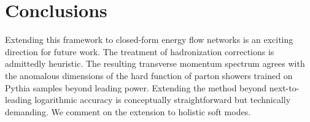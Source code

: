 \section{Conclusions}\label{sec:conclusions}

Extending this framework to closed-form energy flow networks is an
exciting direction for future work. The treatment of hadronization
corrections is admittedly heuristic. The resulting transverse momentum
spectrum agrees with the anomalous dimensions of the hard function of
parton showers trained on Pythia samples beyond leading power. Extending
the method beyond next-to-leading logarithmic accuracy is conceptually
straightforward but technically demanding. We comment on the extension
to holistic soft modes.

